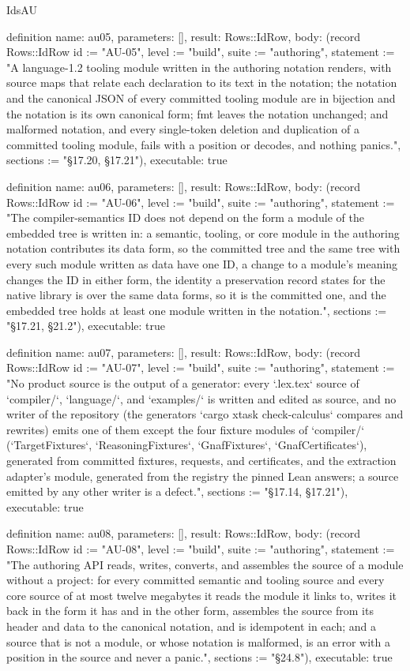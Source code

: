 \begin{lexlean}{IdsAU}
\begin{semanticmodule}
definition{
  name: au05,
  parameters: [],
  result: Rows::IdRow,
  body: (record Rows::IdRow {id := "AU-05", level := "build", suite := "authoring", statement := "A language-1.2 tooling module written in the authoring notation renders, with source maps that relate each declaration to its text in the notation; the notation and the canonical JSON of every committed tooling module are in bijection and the notation is its own canonical form; fmt leaves the notation unchanged; and malformed notation, and every single-token deletion and duplication of a committed tooling module, fails with a position or decodes, and nothing panics.", sections := "§17.20, §17.21"}),
  executable: true
}

definition{
  name: au06,
  parameters: [],
  result: Rows::IdRow,
  body: (record Rows::IdRow {id := "AU-06", level := "build", suite := "authoring", statement := "The compiler-semantics ID does not depend on the form a module of the embedded tree is written in: a semantic, tooling, or core module in the authoring notation contributes its data form, so the committed tree and the same tree with every such module written as data have one ID, a change to a module's meaning changes the ID in either form, the identity a preservation record states for the native library is over the same data forms, so it is the committed one, and the embedded tree holds at least one module written in the notation.", sections := "§17.21, §21.2"}),
  executable: true
}

definition{
  name: au07,
  parameters: [],
  result: Rows::IdRow,
  body: (record Rows::IdRow {id := "AU-07", level := "build", suite := "authoring", statement := "No product source is the output of a generator: every `.lex.tex` source of `compiler/`, `language/`, and `examples/` is written and edited as source, and no writer of the repository (the generators `cargo xtask check-calculus` compares and rewrites) emits one of them except the four fixture modules of `compiler/` (`TargetFixtures`, `ReasoningFixtures`, `GnafFixtures`, `GnafCertificates`), generated from committed fixtures, requests, and certificates, and the extraction adapter's module, generated from the registry the pinned Lean answers; a source emitted by any other writer is a defect.", sections := "§17.14, §17.21"}),
  executable: true
}

definition{
  name: au08,
  parameters: [],
  result: Rows::IdRow,
  body: (record Rows::IdRow {id := "AU-08", level := "build", suite := "authoring", statement := "The authoring API reads, writes, converts, and assembles the source of a module without a project: for every committed semantic and tooling source and every core source of at most twelve megabytes it reads the module it links to, writes it back in the form it has and in the other form, assembles the source from its header and data to the canonical notation, and is idempotent in each; and a source that is not a module, or whose notation is malformed, is an error with a position in the source and never a panic.", sections := "§24.8"}),
  executable: true
}


\end{semanticmodule}
\end{lexlean}
